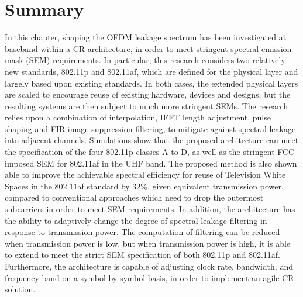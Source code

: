 \section{Summary}
In this chapter, shaping the OFDM leakage spectrum has been investigated at baseband within a CR architecture, in order to meet stringent spectral emission mask (SEM) requirements. 
In particular, this research considers two relatively new standards, 802.11p and 802.11af, which are defined for the physical layer and largely based upon existing standards. 
In both cases, the extended physical layers are scaled to encourage reuse of existing hardware, devices and designs, but the resulting systems are then subject to much more stringent SEMs.
The research relies upon a combination of interpolation, IFFT length adjustment, pulse shaping and FIR image suppression filtering, to mitigate against spectral leakage into adjacent channels. 
Simulations show that the proposed architecture can meet the specification of the four 802.11p classes A to D, as well as the stringent FCC-imposed SEM for 802.11af in the UHF
band.
The proposed method is also shown able to improve the achievable spectral efficiency for reuse of Television White Spaces in the 802.11af standard by 32\%, given equivalent transmission power, compared to conventional approaches which need to drop the outermost subcarriers in order to meet SEM requirements.
In addition, the architecture has the ability to adaptively change the degree of spectral leakage filtering in response to transmission power.
The computation of filtering can be reduced when transmission power is low, but when transmission power is high, it is able to extend to meet the strict SEM specification of both 802.11p and 802.11af. 
Furthermore, the architecture is capable of adjusting clock rate, bandwidth, and frequency band on a symbol-by-symbol basis, in order to implement an agile CR solution.
